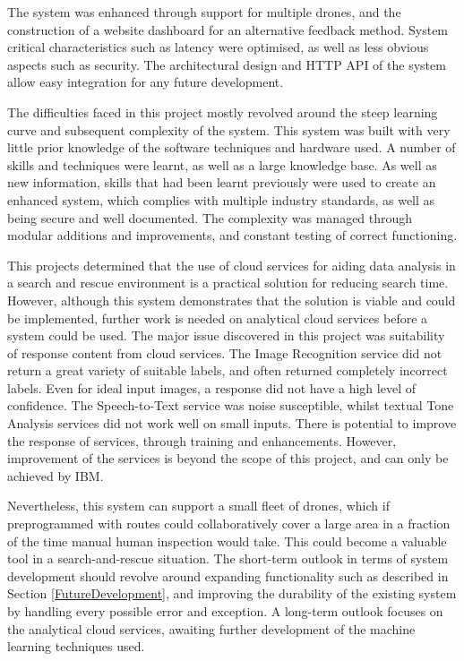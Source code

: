 \documentclass{article}
\begin{document}
The system was enhanced through support for multiple drones, and the construction of a website dashboard for an alternative feedback method. System critical characteristics such as latency were optimised, as well as less obvious aspects such as security. The architectural design and HTTP API of the system allow easy integration for any future development.

The difficulties faced in this project mostly revolved around the steep learning curve and subsequent complexity of the system. This system was built with very little prior knowledge of the software techniques and hardware used. A number of skills and techniques were learnt, as well as a large knowledge base. As well as new information, skills that had been learnt previously were used to create an enhanced system, which complies with multiple industry standards, as well as being secure and well documented. The complexity was managed through modular additions and improvements, and constant testing of correct functioning.

This projects determined that the use of cloud services for aiding data analysis in a search and rescue environment is a practical solution for reducing search time. However, although this system demonstrates that the solution is viable and could be implemented, further work is needed on analytical cloud services before a system could be used. 
The major issue discovered in this project was suitability of response content from cloud services. The Image Recognition service did not return a great variety of suitable labels, and often returned completely incorrect labels. Even for ideal input images, a response did not have a high level of confidence. The Speech-to-Text service was noise susceptible, whilst textual Tone Analysis services did not work well on small inputs. There is potential to improve the response of services, through training and enhancements. However, improvement of the services is beyond the scope of this project, and can only be achieved by IBM. 


Nevertheless, this system can support a small fleet of drones, which if preprogrammed with routes could collaboratively cover a large area in a fraction of the time manual human inspection would take. This could become a valuable tool in a search-and-rescue situation. The short-term outlook in terms of system development should revolve around expanding functionality such as described in Section \ref{FutureDevelopment}, and improving the durability of the existing system by handling every possible error and exception. A long-term outlook focuses on the analytical cloud services, awaiting further development of the machine learning techniques used. 
\end{document}
